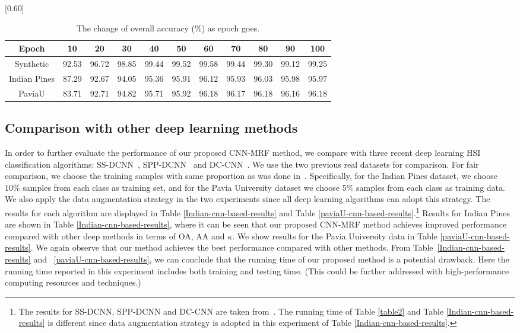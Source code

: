 \documentclass[journal]{IEEEtran}
\begin{document}
		\begin{table}[htp]
			\caption{\label{Epoch_goes} {{The change of overall accuracy (\%) as epoch goes.}}}
			\begin{center}
				{\normalsize
					\scalebox{0.60}[0.60]
					{
						\begin{tabular}{|c|c|c|c|c|c|c|c|c|c|c|}
							\hline
							Epoch & 10  & 20 & 30 & 40 & 50 & 60 & 70  & 80 & 90 & 100\\
							\hline
							Synthetic  & 92.53  & 96.72   & 98.85  & 99.44 & 99.52 & 99.58 & 99.44  & 99.30 & 99.12 & 99.25\\
							\hline
							Indian Pines  & 87.29  & 92.67 & 94.05 & 95.36 & 95.91 & 96.12 & 95.93 & 96.03 & 95.98 & 95.97\\
							\hline
							PaviaU  & 83.71  & 92.71 & 94.82 & 95.71 & 95.92 & 96.18 & 96.17 & 96.18 & 96.16 & 96.18\\
							\hline
						\end{tabular}
					}
				}
			\end{center}
		\end{table}
		
		
		\subsection{Comparison with other deep learning methods }\label{sec.otherdeep}
		In order to further evaluate the performance of our proposed CNN-MRF method, we compare with three recent deep learning HSI classification algorithms: SS-DCNN~\cite{yue2015spectral}, SPP-DCNN~\cite{yue2016deep} and DC-CNN~\cite{zhang2017spectral}. We use the two previous real datasets for comparison. For fair comparison, we choose the training samples with same proportion as was done in~\cite{zhang2017spectral}. Specifically, for the Indian Pines dataset, we choose 10\% samples from each class as training set, and for the Pavia University dataset we choose 5\% samples from each class as training data. We also apply the data augmentation strategy in the two experiments since all deep learning algorithms can adopt this strategy. The results for each algorithm are displayed in Table \ref{Indian-cnn-based-results} and Table \ref{paviaU-cnn-based-results}.\footnote{The results for SS-DCNN, SPP-DCNN and DC-CNN are taken from~\cite{zhang2017spectral}. The running time of Table \ref{table2} and Table {\ref{Indian-cnn-based-results}} is different since data augmentation strategy is adopted in this experiment of Table \ref{Indian-cnn-based-results}.} Results for Indian Pines are shown in Table
		\ref{Indian-cnn-based-results}, where it can be seen that our proposed CNN-MRF method achieves improved performance compared with other deep methods in terms of OA, AA and $\kappa$. We show results for the Pavia University data in Table \ref{paviaU-cnn-based-results}. {{We again observe that our method achieves the best performance compared with other methods. From Table~\ref{Indian-cnn-based-results} and ~\ref{paviaU-cnn-based-results}, we can conclude that the running time of our proposed method is a potential drawback. Here the running time reported in this experiment includes both training and testing time. (This could be further addressed with high-performance computing resources and techniques.)}}
		
\end{document}
